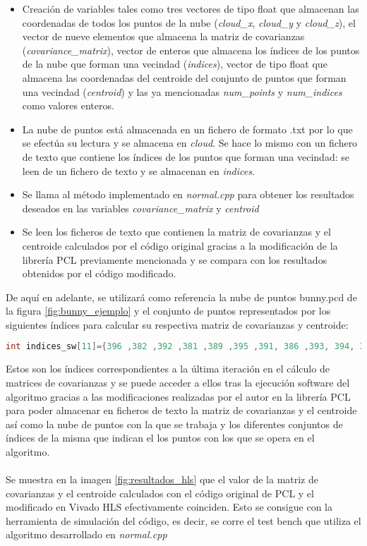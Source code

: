 \begin{itemize}
\item Creación de variables tales como tres vectores de tipo float que almacenan las coordenadas de todos los puntos de la nube (\textit{cloud\_x}, \textit{cloud\_y} y \textit{cloud\_z}), el vector de nueve elementos que almacena la matriz de covarianzas (\textit{covariance\_matrix}), vector de enteros que almacena los índices de los puntos de la nube que forman una vecindad (\textit{indices}), vector de tipo float que almacena las coordenadas del centroide del conjunto de puntos que forman una vecindad (\textit{centroid}) y las ya mencionadas \textit{num\_points} y \textit{num\_indices} como valores enteros.

\item La nube de puntos está almacenada en un fichero de formato .txt por lo que se efectúa su lectura y se almacena en \textit{cloud}. Se hace lo mismo con un fichero de texto que contiene los índices de los puntos que forman una vecindad: se leen de un fichero de texto y se almacenan en \textit{indices}.

\item Se llama al método implementado en \textit{normal.cpp} para obtener los resultados deseados en las variables \textit{covariance\_matrix} y \textit{centroid}

\item Se leen los ficheros de texto que contienen la matriz de covarianzas y el centroide calculados por el código original gracias a la modificación de la librería PCL previamente mencionada y se compara con los resultados obtenidos por el código modificado.
\end{itemize}

De aquí en adelante, se utilizará como referencia la nube de puntos bunny.pcd de la figura \ref{fig:bunny_ejemplo} y el conjunto de puntos representados por los siguientes índices para calcular su respectiva matriz de covarianzas y centroide:


\begin{lstlisting}[language=C++,breaklines]
int indices_sw[11]={396 ,382 ,392 ,381 ,389 ,395 ,391, 386 ,393, 394, 385 };
\end{lstlisting}

Estos son los índices correspondientes a la última iteración en el cálculo de matrices de covarianzas y se puede acceder a ellos tras la ejecución software del algoritmo gracias a las modificaciones realizadas por el autor en la librería PCL para poder almacenar en ficheros de texto la matriz de covarianzas y el centroide así como la nube de puntos con la que se trabaja y los diferentes conjuntos de índices de la misma que indican el los puntos con los que se opera en el algoritmo.
\\
\\
Se muestra en la imagen \ref{fig:resultados_hls} que el valor de la matriz de covarianzas y el centroide calculados con el código original de PCL y el modificado en Vivado HLS efectivamente coinciden. Esto se consigue con la herramienta de simulación del código, es decir, se corre el test bench que utiliza el algoritmo desarrollado en \textit{normal.cpp}

